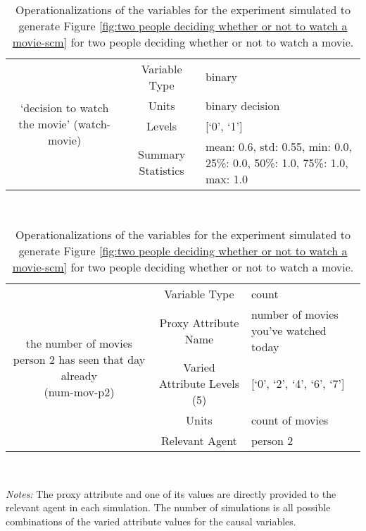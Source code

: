 \documentclass[12pt]{article}
\begin{document}
\begin{table}[ht]
\centering
\caption{Operationalizations of the variables for the experiment simulated to generate Figure \ref{fig:two people deciding whether or not to watch a movie-scm} for two people deciding whether or not to watch a movie.}
\

\begin{tabularx}{\textwidth}{|c|c|X|}
\hline

\multirow{4}{*}{\parbox{5cm} { \centering `decision to watch the movie' (watch-movie)}} & Variable Type & binary  \\ \cline{2-3}
                        &  Units   &  binary decision   \\ \cline{2-3}
                        & Levels & [`0', `1'] \\ \cline{2-3}
                        & Summary Statistics   & mean: 0.6, std: 0.55, min: 0.0, 25\%: 0.0, 50\%: 1.0, 75\%: 1.0, max: 1.0    \\ \hline
\end{tabularx}\\
                


\begin{tabularx}{\textwidth}{|c|c|X|}
\hline
\multirow{5}{*}{\parbox{5cm} { \centering the number of movies person 2 has seen that day already \\(num-mov-p2)}} & Variable Type & count  \\ \cline{2-3}
                        & Proxy Attribute Name   & number of movies you've watched today   \\ \cline{2-3}
                        & Varied Attribute Levels (5)  & [`0', `2', `4', `6', `7']   \\ \cline{2-3}
                        & Units  & count of movies   \\ \cline{2-3}
                        & Relevant Agent   & person 2   \\ \hline
\end{tabularx}\\
    \begin{minipage}{\textwidth}
    \begin{footnotesize}
      \emph{Notes:} The proxy attribute and one of its values are directly provided to the relevant agent in each simulation.
      The number of simulations is all possible combinations of the varied attribute values for the causal variables.
    \end{footnotesize}
    \end{minipage}
\end{table}
\end{document}
